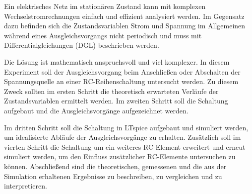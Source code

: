 %
Ein elektrisches Netz im stationären Zustand kann mit komplexen Wechselstromrechnungen einfach und effizient analysiert
werden. Im Gegensatz dazu befinden sich die Zustandsvariablen Strom und Spannung im Allgemeinen während eines
Ausgleichsvorgangs 
nicht periodisch und muss mit Differentialgleichungen (DGL) beschrieben werden. 

Die Lösung ist mathematisch anspruchsvoll und viel komplexer. In diesem Experiment soll der Ausgleichsvorgang beim Anschließen oder Abschalten der Spannungsquelle an einer RC-Reihenschaltung untersucht werden. Zu diesem Zweck sollten im ersten Schritt die theoretisch erwarteten Verläufe der Zustandsvariablen ermittelt werden. Im zweiten Schritt soll die Schaltung aufgebaut und die Ausgleichsvorgänge aufgezeichnet werden.

Im dritten Schritt soll die Schaltung in LTspice aufgebaut und simuliert werden, um
idealisierte Abläufe der Ausgleichsvorgänge zu erhalten. Zusätzlich soll im vierten Schritt die Schaltung um ein weiteres RC-Element erweitert und erneut simuliert werden, um den Einfluss zusätzlicher RC-Elemente untersuchen zu können. Abschließend sind die theoretischen, gemessenen und die aus der Simulation erhaltenen Ergebnisse zu beschreiben, zu vergleichen und zu interpretieren.
%
%
%
\begin{flushright}
  \textit{\autorA}
\end{flushright}
%
%
%
